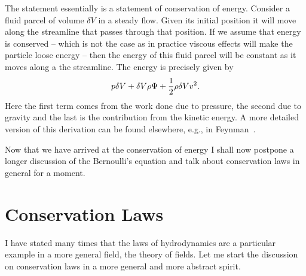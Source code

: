 The statement  essentially is a statement of conservation of
energy. Consider a fluid parcel of volume $\delta V$ in a steady
flow. Given its initial position it will move along the streamline
that passes through that position. If we assume that energy is
conserved -- which is not the case as in practice viscous effects will
make the particle loose energy -- then the energy of this fluid parcel
will be constant as it moves along a the streamline. The energy is
precisely given by 
\begin{equation}
p\delta V + \delta V\rho \Psi + \frac{1}{2}\rho \delta V v^2\/.
\nonumber
\end{equation}
Here the first term comes from the work done due to pressure, the
second due to gravity and the last is the contribution from the
kinetic energy. A more detailed version of this derivation can be
found elsewhere, e.g.,  in Feynman~\cite{Feynman77}.

Now that we have arrived at the conservation of energy I shall now
postpone a longer discussion of the Bernoulli's equation and talk
about conservation laws in general for a moment. 

\section{Conservation Laws}

I have stated many times that the laws of hydrodynamics are a
particular example in a more general field, the theory of fields. 
 Let me start the discussion on conservation laws in a more general 
and more abstract spirit. 

